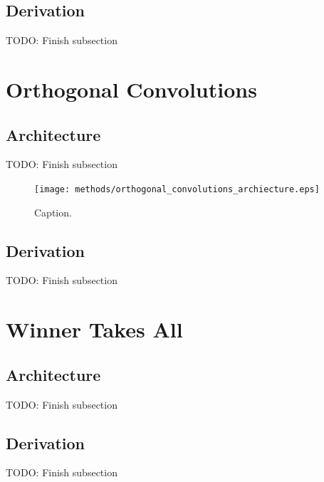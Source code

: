 \subsection{Derivation}
TODO: Finish subsection

%
%
%
%
%
\section{Orthogonal Convolutions}
\lipsum[2]
\subsection{Architecture}
TODO: Finish subsection
\begin{figure}[h!]
\centering
\captionsetup{justification=centering}
\texttt{[image: methods/orthogonal\_convolutions\_archiecture.eps]}
\caption{Caption.}
\label{fig:orthogonal_convolutions_archiecture}
\end{figure}

\subsection{Derivation}
TODO: Finish subsection

%
%
%
%
%
\section{Winner Takes All}
\lipsum[2]
\subsection{Architecture}
TODO: Finish subsection
\subsection{Derivation}
TODO: Finish subsection
